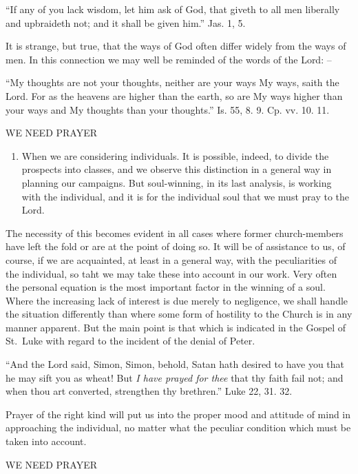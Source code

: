 \documentclass[
]{book}
\providecommand{\tightlist}{%
  \setlength{\itemsep}{0pt}\setlength{\parskip}{0pt}}
\begin{document}
``If any of you lack wisdom, let him ask of God, that giveth to all men liberally and upbraideth not; and it shall be given him.'' Jas. 1, 5.

It is strange, but true, that the ways of God often differ widely from the ways of men. In this connection we may well be reminded of the words of the Lord: --

``My thoughts are not your thoughts, neither are your ways My ways, saith the Lord. For as the heavens are higher than the earth, so are My ways higher than your ways and My thoughts than your thoughts.'' Is. 55, 8. 9. Cp. vv. 10. 11.

WE NEED PRAYER

\begin{enumerate}
\def\labelenumi{\alph{enumi}.}
\setcounter{enumi}{1}
\tightlist
\item
  When we are considering individuals. It is possible, indeed, to divide the prospects into classes, and we observe this distinction in a general way in planning our campaigns. But soul-winning, in its last analysis, is working with the individual, and it is for the individual soul that we must pray to the Lord.
\end{enumerate}

The necessity of this becomes evident in all cases where former church-members have left the fold or are at the point of doing so. It will be of assistance to us, of course, if we are acquainted, at least in a general way, with the peculiarities of the individual, so taht we may take these into account in our work. Very often the personal equation is the most important factor in the winning of a soul. Where the increasing lack of interest is due merely to negligence, we shall handle the situation differently than where some form of hostility to the Church is in any manner apparent. But the main point is that which is indicated in the Gospel of St.~Luke with regard to the incident of the denial of Peter.

``And the Lord said, Simon, Simon, behold, Satan hath desired to have you that he may sift you as wheat! But \emph{I have prayed for thee} that thy faith fail not; and when thou art converted, strengthen thy brethren.'' Luke 22, 31. 32.

Prayer of the right kind will put us into the proper mood and attitude of mind in approaching the individual, no matter what the peculiar condition which must be taken into account.

WE NEED PRAYER
\end{document}
